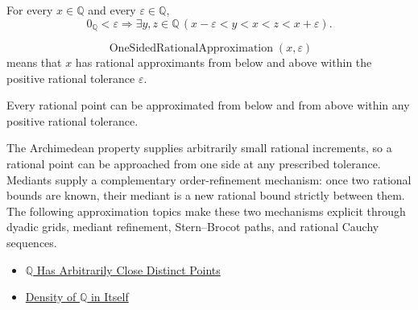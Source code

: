 \begin{remark*}
For every $x\in\mathbb{Q}$ and every $\varepsilon\in\mathbb{Q}$,
\[
0_{\mathbb{Q}}<\varepsilon
\Longrightarrow
\exists y,z\in\mathbb{Q}\,(x-\varepsilon<y<x<z<x+\varepsilon).
\]
\end{remark*}

\begin{remark*}
\[
\operatorname{OneSidedRationalApproximation}(x,\varepsilon)
\]
means that $x$ has rational approximants from below and above within the positive rational tolerance $\varepsilon$.
\end{remark*}

\begin{remark*}[Interpretation]
Every rational point can be approximated from below and from above within any
positive rational tolerance.


The Archimedean property supplies arbitrarily small rational increments, so a
rational point can be approached from one side at any prescribed tolerance.
Mediants supply a complementary order-refinement mechanism: once two rational
bounds are known, their mediant is a new rational bound strictly between them.
The following approximation topics make these two mechanisms explicit through
dyadic grids, mediant refinement, Stern--Brocot paths, and rational Cauchy
sequences.
\end{remark*}

\begin{dependencies}
\begin{itemize}
  \item \hyperref[thm:q-has-arbitrarily-close-distinct-points]{$\mathbb{Q}$ Has Arbitrarily Close Distinct Points}
  \item \hyperref[thm:density-of-q]{Density of $\mathbb{Q}$ in Itself}
\end{itemize}
\end{dependencies}
